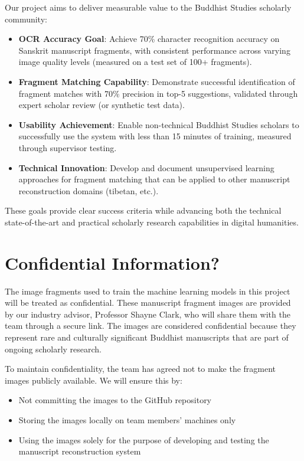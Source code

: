 \documentclass{article}
\begin{document}
Our project aims to deliver measurable value to the Buddhist Studies scholarly community:

\begin{itemize}
\item \textbf{OCR Accuracy Goal}: Achieve 70\% character recognition accuracy on Sanskrit manuscript fragments, with consistent performance across varying image quality levels (measured on a test set of 100+ fragments).

\item \textbf{Fragment Matching Capability}: Demonstrate successful identification of fragment matches with 70\% precision in top-5 suggestions, validated through expert scholar review (or synthetic test data).

\item \textbf{Usability Achievement}: Enable non-technical Buddhist Studies scholars to successfully use the system with less than 15 minutes of training, measured through supervisor testing.

\item \textbf{Technical Innovation}: Develop and document unsupervised learning approaches for fragment matching that can be applied to other manuscript reconstruction domains (tibetan, etc.).
\end{itemize}

These goals provide clear success criteria while advancing both the technical state-of-the-art and practical scholarly research capabilities in digital humanities.

\section{Confidential Information?}

The image fragments used to train the machine learning models in this project will be treated as confidential. These manuscript fragment images are provided by our industry advisor, Professor Shayne Clark, who will share them with the team through a secure link. The images are considered confidential because they represent rare and culturally significant Buddhist manuscripts that are part of ongoing scholarly research.

To maintain confidentiality, the team has agreed not to make the fragment images publicly available. We will ensure this by:

\begin{itemize}
    \item Not committing the images to the GitHub repository
    \item Storing the images locally on team members' machines only
    \item Using the images solely for the purpose of developing and testing the manuscript reconstruction system
\end{itemize}
\end{document}

